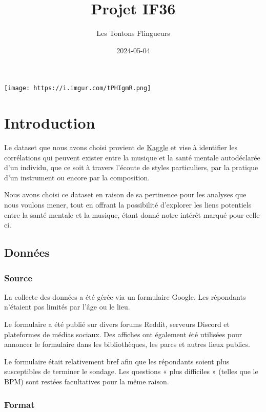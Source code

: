 \documentclass[
]{article}
\title{Projet IF36}
\author{Les Tontons Flingueurs}
\date{2024-05-04}
\begin{document}
\maketitle

\texttt{[image: https://i.imgur.com/tPHIgmR.png]}

\hypertarget{introduction}{%
\section{Introduction}\label{introduction}}

Le dataset que nous avons choisi provient de
\href{https://www.kaggle.com/datasets/catherinerasgaitis/mxmh-survey-results/data}{Kaggle}
et vise à identifier les corrélations qui peuvent exister entre la
musique et la santé mentale autodéclarée d'un individu, que ce soit à
travers l'écoute de styles particuliers, par la pratique d'un instrument
ou encore par la composition.

Nous avons choisi ce dataset en raison de sa pertinence pour les
analyses que nous voulons mener, tout en offrant la possibilité
d'explorer les liens potentiels entre la santé mentale et la musique,
étant donné notre intérêt marqué pour celle-ci.

\hypertarget{donnuxe9es}{%
\subsection{Données}\label{donnuxe9es}}

\hypertarget{source}{%
\subsubsection{Source}\label{source}}

La collecte des données a été gérée via un formulaire Google. Les
répondants n'étaient pas limités par l'âge ou le lieu.

Le formulaire a été publié sur divers forums Reddit, serveurs Discord et
plateformes de médias sociaux. Des affiches ont également été utilisées
pour annoncer le formulaire dans les bibliothèques, les parcs et autres
lieux publics.

Le formulaire était relativement bref afin que les répondants soient
plus susceptibles de terminer le sondage. Les questions « plus
difficiles » (telles que le BPM) sont restées facultatives pour la même
raison.

\hypertarget{format}{%
\subsubsection{Format}\label{format}}
\end{document}
